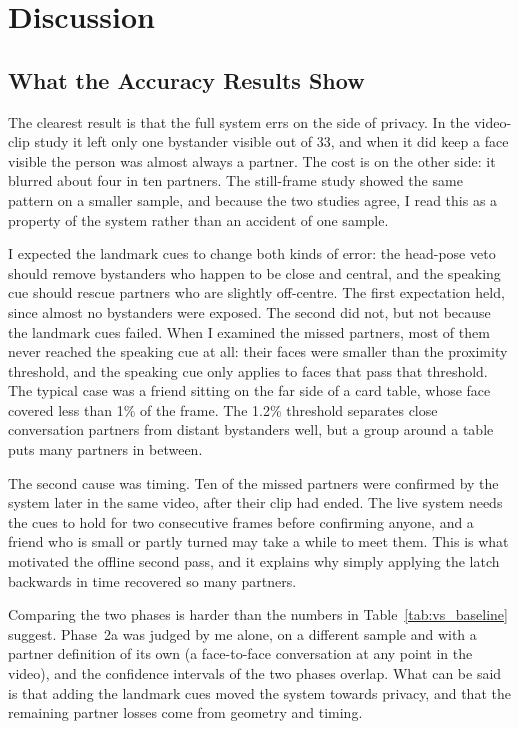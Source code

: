\section{Discussion}
\label{sec:discussion}

\subsection{What the Accuracy Results Show}
\label{sec:disc_perf}

The clearest result is that the full system errs on the side of privacy. In the video-clip
study it left only one bystander visible out of 33, and when it did keep a face visible
the person was almost always a partner. The cost is on the other side: it blurred about
four in ten partners. The still-frame study showed the same pattern on a smaller sample,
and because the two studies agree, I read this as a property of the system rather than an
accident of one sample.

I expected the landmark cues to change both kinds of error: the head-pose veto should
remove bystanders who happen to be close and central, and the speaking cue should rescue
partners who are slightly off-centre. The first expectation held, since almost no
bystanders were exposed. The second did not, but not because the landmark cues failed.
When I examined the missed partners, most of them never reached the speaking cue at all:
their faces were smaller than the proximity threshold, and the speaking cue only applies to
faces that pass that threshold. The typical case was a friend sitting on the far side of
a card table, whose face covered less than 1\% of the frame. The 1.2\% threshold separates
close conversation partners from distant bystanders well, but a group around a table puts
many partners in between.

The second cause was timing. Ten of the missed partners were confirmed by the system
later in the same video, after their clip had ended. The live system needs the cues to
hold for two consecutive frames before confirming anyone, and a friend who is small or
partly turned may take a while to meet them. This is what motivated the offline second
pass, and it explains why simply applying the latch backwards in time recovered so many
partners.

Comparing the two phases is harder than the numbers in Table~\ref{tab:vs_baseline}
suggest. Phase~2a was judged by me alone, on a different sample and with a partner
definition of its own (a face-to-face conversation at any point in the video), and the
confidence intervals of the two phases overlap. What can be said is that adding the landmark cues moved the system
towards privacy, and that the remaining partner losses come from geometry and timing.

